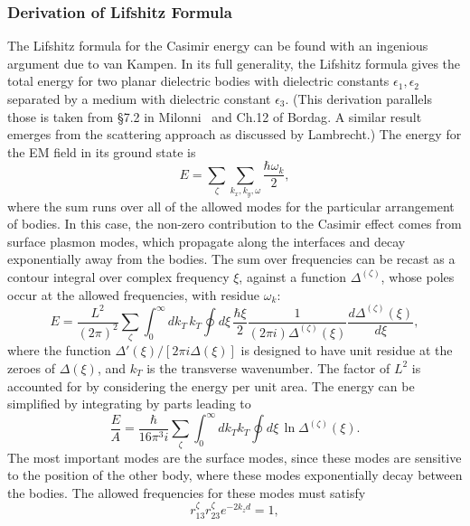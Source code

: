 \subsubsection{Derivation of Lifshitz Formula}
\label{sec:lifshitz}
The Lifshitz formula for the Casimir energy can be found with an ingenious argument due to van Kampen\etal\cite{vanKampen1968}.
In its full generality, the Lifshitz formula gives the total energy for two planar dielectric bodies with dielectric constants $\epsilon_1,\epsilon_2$
separated by a medium with dielectric constant $\epsilon_3$.  
(This derivation parallels those is taken from \S 7.2 in Milonni~\cite{Milonni1994} and Ch.12 of Bordag\etal\cite{Bordag2009}.
A similar result emerges from the scattering approach as discussed by Lambrecht\etal\cite{Lambrecht2011}.)
The energy for the EM field in its ground state is 
\begin{equation}
  E = \sum_{\zeta}\sum_{k_x,k_y,\omega} \frac{\hbar\omega_k}{2},
\end{equation}
where the sum runs over all of the allowed modes for the particular arrangement of bodies.  
In this case, the  non-zero contribution to the Casimir effect comes from surface plasmon modes, which propagate along the interfaces
and decay exponentially away from the bodies.  
The sum over frequencies can be recast as a contour integral over complex frequency $\xi$, against a function $\Delta^{(\zeta)}$,
 whose poles occur at the allowed frequencies, with residue $\omega_k$:  
\begin{equation}
  E = \frac{L^2}{(2\pi)^2}\sum_{\zeta}\int_0^\infty dk_T\,k_T\oint d\xi\, 
  \frac{\hbar \xi}{2} \frac{1}{(2\pi i)\Delta^{(\zeta)}(\xi)}\frac{d\Delta^{(\zeta)}(\xi)}{d\xi},
\end{equation}
where the function $\Delta'(\xi)/[2\pi i\Delta(\xi)]$ is designed to have unit residue at the zeroes of $\Delta(\xi)$, 
and $k_T$ is the transverse wavenumber.  The factor of $L^2$ is accounted for by considering the energy 
per unit area.  
The energy can be simplified by integrating by parts leading to 
\begin{equation}
  \frac{E}{A} = \frac{\hbar}{16\pi^3 i}\sum_{\zeta}\int_0^\infty dk_Tk_T\oint d\xi \, \ln\Delta^{(\zeta)}(\xi).
\end{equation}
The most important modes are the surface modes, since these modes are sensitive to the position of the other body, where
these modes exponentially decay between the bodies.
The allowed frequencies for these modes must satisfy 
\begin{equation}
  r^{\zeta}_{13}r^{\zeta}_{23} e^{-2k_z d}=1,
\end{equation}
